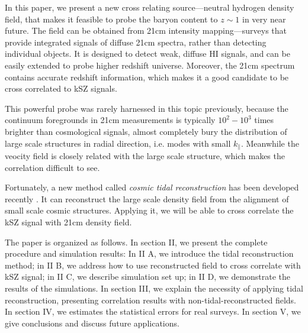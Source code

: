 In this paper, we present a new cross relating source---neutral hydrogen density field, 
that makes it feasible to probe the baryon content to $z\sim1$ in very near future.
The field can be obtained from 21cm intensity mapping---surveys that provide integrated signals of diffuse 21cm spectra, 
rather than detecting individual objects. 
It is designed to detect weak, diffuse HI signals, and can be easily extended to probe higher redshift universe.
Moreover, the 21cm spectrum contains accurate redshift information, which makes it a good candidate to be cross correlated to kSZ signals.

This powerful probe was rarely harnessed in this topic previously, 
because the continuum foregrounds in 21cm measurements is typically $10^2 - 10^3$ times brighter than cosmological signals, almost completely bury the distribution of large scale structures in radial direction, i.e. modes with small $k_\parallel$.
Meanwhile the veocity field is closely related with the large scale structure, 
which makes the correlation difficult to see.


Fortunately, a new method called {\it cosmic tidal reconstruction} has been 
developed recently \cite{2012:pen}\cite{2015:zhu}. 
It can reconstruct the large scale density field from the alignment of small 
scale cosmic structures. Applying it, we will be able to cross correlate the kSZ signal with 21cm density field.

The paper is organized as follows. 
In section II, we present the complete procedure and simulation results: 
In II A, we introduce the tidal reconstruction method; 
in II B, we address how to use reconstructed field to cross correlate
with kSZ signal; 
in II C, we describe simulation set up; 
in II D, we demonstrate the results of the simulations.
In section III, we explain the necessity of applying tidal reconstruction, 
presenting correlation results with non-tidal-reconstructed fields. 
In section IV, we estimates the statistical errors for real surveys.
In section V, we give conclusions and discuss future applications.



